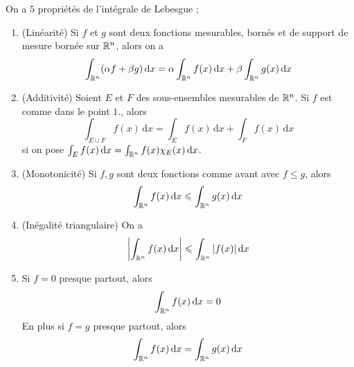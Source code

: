 \begin{proposition} \label{prop: Propriétés de l'intégrale de Lebesgue pour des fonctions bornées}
	On a $5$ propriétés de l'intégrale de Lebesgue ; 
	\begin{enumerate}
		\item (Linéarité) Si $f$ et $g$ sont deux fonctions mesurables, bornés et de support de mesure bornée sur $\mathbb{R}^n$, alors on a 
		\[
		\int_{\mathbb{R}^n} (\alpha f + \beta g) \, \mathrm dx = \alpha \int_{\mathbb{R}^n} f(x) \, \mathrm dx + \beta \int_{\mathbb{R}^n} g(x) \, \mathrm dx 
		\]
		\item (Additivité) Soient $E$ et $F$ des sous-ensembles mesurables de $\mathbb{R}^n$. Si $f$ est comme dans le point $1.$, alors
		\[
		\int_{E \cup F} f(x) \, \mathrm dx = \int_E f(x) \, \mathrm dx + \int_F f(x) \, \mathrm dx
		\]
		si on pose $\int_E f(x) \, \mathrm dx = \int_{\mathbb{R}^n} f(x) \chi_E(x) \, \mathrm dx$.
		
		\item (Monotonicité) Si $f,g$ sont deux fonctions comme avant avec $f \leqslant g$, alors
		\[
		\int_{\mathbb{R}^n} f(x) \, \mathrm dx \leqslant \int_{\mathbb{R}^n} g(x) \, \mathrm dx
		\]
		\item (Inégalité triangulaire) On a
		\[
		\left|\int_{\mathbb{R}^n} f(x) \, \mathrm dx \right| \leqslant \int_{\mathbb{R}^n} |f(x)| \, \mathrm dx 
		\]
		\item Si $f = 0$ presque partout, alors
		\[
		\int_{\mathbb{R}^n} f(x) \, \mathrm dx = 0
		\]
		En plus si $f = g$ presque partout, alors
		\[
		\int_{\mathbb{R}^n} f(x) \, \mathrm dx = \int_{\mathbb{R}^n} g(x) \, \mathrm dx 
		\]
	\end{enumerate}
	
\end{proposition}

